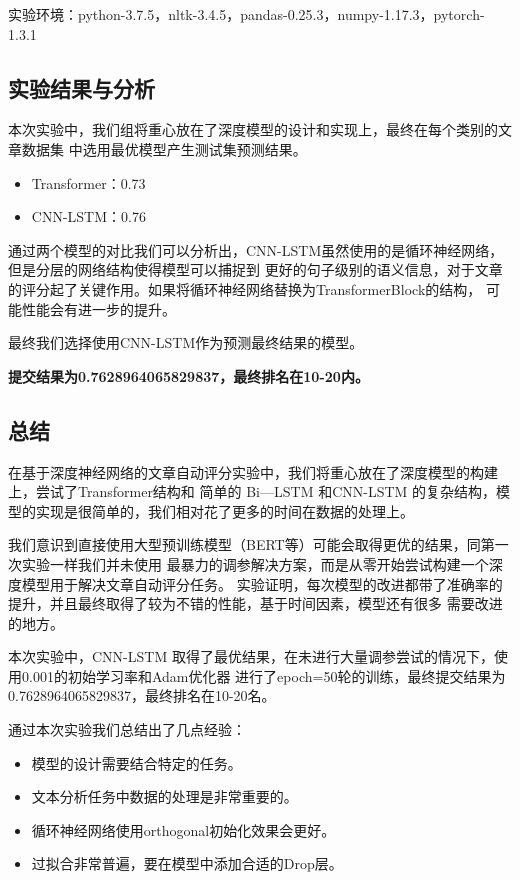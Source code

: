 \documentclass[UTF8]{article}
\begin{document}
实验环境：python-3.7.5，nltk-3.4.5，pandas-0.25.3，numpy-1.17.3，pytorch-1.3.1

\subsection{实验结果与分析}

本次实验中，我们组将重心放在了深度模型的设计和实现上，最终在每个类别的文章数据集
中选用最优模型产生测试集预测结果。

\begin{itemize}
    \item Transformer：0.73
    \item CNN-LSTM：0.76
\end{itemize}

通过两个模型的对比我们可以分析出，CNN-LSTM虽然使用的是循环神经网络，但是分层的网络结构使得模型可以捕捉到
更好的句子级别的语义信息，对于文章的评分起了关键作用。如果将循环神经网络替换为TransformerBlock的结构，
可能性能会有进一步的提升。

最终我们选择使用CNN-LSTM作为预测最终结果的模型。

\textbf{提交结果为0.7628964065829837，最终排名在10-20内。}

\subsection{总结}

在基于深度神经网络的文章自动评分实验中，我们将重心放在了深度模型的构建上，尝试了Transformer结构和
简单的 Bi—LSTM 和CNN-LSTM 的复杂结构，模型的实现是很简单的，我们相对花了更多的时间在数据的处理上。

我们意识到直接使用大型预训练模型（BERT等）可能会取得更优的结果，同第一次实验一样我们并未使用
最暴力的调参解决方案，而是从零开始尝试构建一个深度模型用于解决文章自动评分任务。
实验证明，每次模型的改进都带了准确率的提升，并且最终取得了较为不错的性能，基于时间因素，模型还有很多
需要改进的地方。

本次实验中，CNN-LSTM 取得了最优结果，在未进行大量调参尝试的情况下，使用0.001的初始学习率和Adam优化器
进行了epoch=50轮的训练，最终提交结果为 0.7628964065829837，最终排名在10-20名。

通过本次实验我们总结出了几点经验：
\begin{itemize}
    \item 模型的设计需要结合特定的任务。
    \item 文本分析任务中数据的处理是非常重要的。
    \item 循环神经网络使用orthogonal初始化效果会更好。
    \item 过拟合非常普遍，要在模型中添加合适的Drop层。
\end{itemize}
\end{document}
